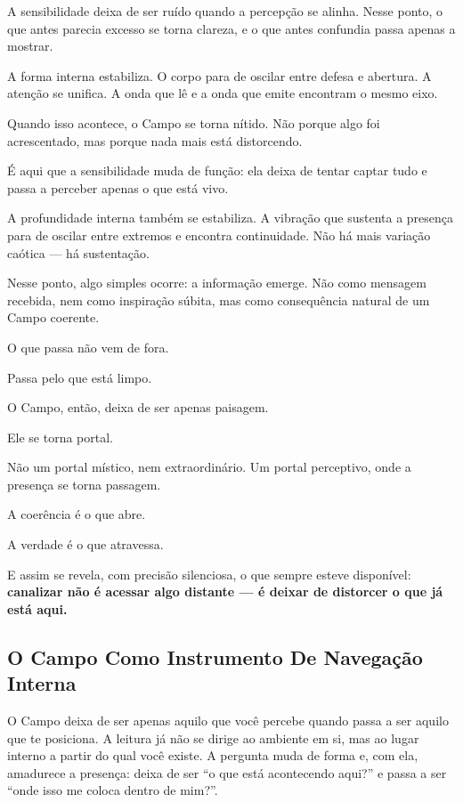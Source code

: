 \documentclass[12pt]{book}
\begin{document}
A sensibilidade deixa de ser ruído quando a percepção se alinha. Nesse ponto, o que antes parecia excesso se torna clareza, e o que antes confundia passa apenas a mostrar.

A forma interna estabiliza. O corpo para de oscilar entre defesa e abertura. A atenção se unifica. A onda que lê e a onda que emite encontram o mesmo eixo.

Quando isso acontece, o Campo se torna nítido. Não porque algo foi acrescentado, mas porque nada mais está distorcendo.

É aqui que a sensibilidade muda de função: ela deixa de tentar captar tudo e passa a perceber apenas o que está vivo.

A profundidade interna também se estabiliza. A vibração que sustenta a presença para de oscilar entre extremos e encontra continuidade. Não há mais variação caótica --- há sustentação.

Nesse ponto, algo simples ocorre: a informação emerge. Não como mensagem recebida, nem como inspiração súbita, mas como consequência natural de um Campo coerente.

O que passa não vem de fora.

Passa pelo que está limpo.

O Campo, então, deixa de ser apenas paisagem.

Ele se torna portal.

Não um portal místico, nem extraordinário. Um portal perceptivo, onde a presença se torna passagem.

A coerência é o que abre.

A verdade é o que atravessa.

E assim se revela, com precisão silenciosa, o que sempre esteve disponível: \textbf{canalizar não é acessar algo distante --- é deixar de distorcer o que já está aqui.}

\subsection*{O Campo Como Instrumento De Navegação Interna}

O Campo deixa de ser apenas aquilo que você percebe quando passa a ser aquilo que te posiciona. A leitura já não se dirige ao ambiente em si, mas ao lugar interno a partir do qual você existe. A pergunta muda de forma e, com ela, amadurece a presença: deixa de ser \enquote{o que está acontecendo aqui?} e passa a ser \enquote{onde isso me coloca dentro de mim?}.
\end{document}
